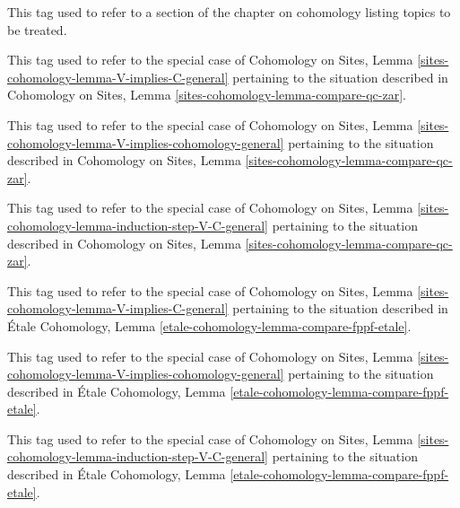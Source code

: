 \begin{remark}
\label{remark-sites-cohomology-topics}
This tag used to refer to a section of the chapter on cohomology
listing topics to be treated.
\end{remark}

\begin{remark}
\label{remark-V-implies-C}
This tag used to refer to the special case of
Cohomology on Sites, Lemma \ref{sites-cohomology-lemma-V-implies-C-general}
pertaining to the situation described in
Cohomology on Sites, Lemma \ref{sites-cohomology-lemma-compare-qc-zar}.
\end{remark}

\begin{remark}
\label{remark-V-implies-cohomology}
This tag used to refer to the special case of
Cohomology on Sites, Lemma
\ref{sites-cohomology-lemma-V-implies-cohomology-general}
pertaining to the situation described in
Cohomology on Sites, Lemma \ref{sites-cohomology-lemma-compare-qc-zar}.
\end{remark}

\begin{remark}
\label{remark-induction-step-V-C}
This tag used to refer to the special case of
Cohomology on Sites, Lemma
\ref{sites-cohomology-lemma-induction-step-V-C-general}
pertaining to the situation described in
Cohomology on Sites, Lemma \ref{sites-cohomology-lemma-compare-qc-zar}.
\end{remark}

\begin{remark}
\label{remark-V-implies-C-etale-fppf}
This tag used to refer to the special case of
Cohomology on Sites, Lemma \ref{sites-cohomology-lemma-V-implies-C-general}
pertaining to the situation described in
\'Etale Cohomology, Lemma \ref{etale-cohomology-lemma-compare-fppf-etale}.
\end{remark}

\begin{remark}
\label{remark-V-implies-cohomology-etale-fppf}
This tag used to refer to the special case of
Cohomology on Sites, Lemma
\ref{sites-cohomology-lemma-V-implies-cohomology-general}
pertaining to the situation described in
\'Etale Cohomology, Lemma \ref{etale-cohomology-lemma-compare-fppf-etale}.
\end{remark}

\begin{remark}
\label{remark-induction-step-V-C-etale-fppf}
This tag used to refer to the special case of
Cohomology on Sites, Lemma
\ref{sites-cohomology-lemma-induction-step-V-C-general}
pertaining to the situation described in
\'Etale Cohomology, Lemma \ref{etale-cohomology-lemma-compare-fppf-etale}.
\end{remark}

